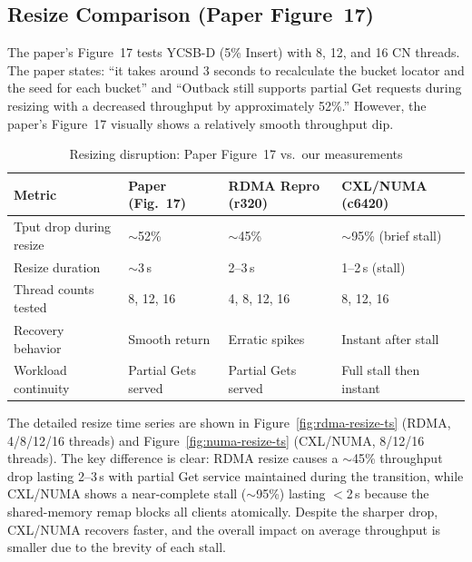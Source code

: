 \documentclass[conference]{IEEEtran}
\begin{document}
\subsection{Resize Comparison (Paper Figure~17)}

The paper's Figure~17 tests YCSB-D (5\% Insert) with 8, 12, and 16 CN threads. The paper states: ``it takes around 3 seconds to recalculate the bucket locator and the seed for each bucket'' and ``Outback still supports partial Get requests during resizing with a decreased throughput by approximately 52\%.'' However, the paper's Figure~17 visually shows a relatively smooth throughput dip.

\begin{table}[H]
\centering
\caption{Resizing disruption: Paper Figure~17 vs.\ our measurements}
\label{tab:resize-cmp}
\small
\begin{tabular}{@{}lp{2.8cm}p{2.8cm}p{2.8cm}@{}}
\toprule
\textbf{Metric} & \textbf{Paper (Fig.~17)} & \textbf{RDMA Repro (r320)} & \textbf{CXL/NUMA (c6420)} \\
\midrule
Tput drop during resize & $\sim$52\% & $\sim$45\% & $\sim$95\% (brief stall) \\
Resize duration & $\sim$3\,s & 2--3\,s & 1--2\,s (stall) \\
Thread counts tested & 8, 12, 16 & 4, 8, 12, 16 & 8, 12, 16 \\
Recovery behavior & Smooth return & Erratic spikes & Instant after stall \\
Workload continuity & Partial Gets served & Partial Gets served & Full stall then instant \\
\bottomrule
\end{tabular}
\end{table}

The detailed resize time series are shown in Figure~\ref{fig:rdma-resize-ts} (RDMA, 4/8/12/16 threads) and Figure~\ref{fig:numa-resize-ts} (CXL/NUMA, 8/12/16 threads). The key difference is clear: RDMA resize causes a $\sim$45\% throughput drop lasting 2--3\,s with partial Get service maintained during the transition, while CXL/NUMA shows a near-complete stall ($\sim$95\%) lasting $<$2\,s because the shared-memory remap blocks all clients atomically. Despite the sharper drop, CXL/NUMA recovers faster, and the overall impact on average throughput is smaller due to the brevity of each stall.
\end{document}
